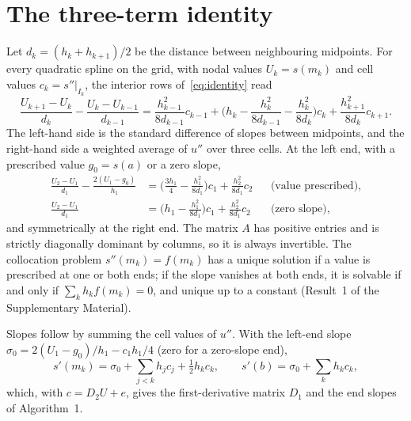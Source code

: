 \appendix

\section{The three-term identity}\label{app:identity}
Let $d_k=(h_k+h_{k+1})/2$ be the distance between neighbouring midpoints. For every quadratic spline on the
grid, with nodal values $U_k=s(m_k)$ and cell values $c_k=s''|_{I_k}$, the interior rows of~\eqref{eq:identity}
read
\begin{equation}\label{eq:interior}
\frac{U_{k+1}-U_k}{d_k}-\frac{U_k-U_{k-1}}{d_{k-1}}
=\frac{h_{k-1}^2}{8d_{k-1}}c_{k-1}+\Big(h_k-\frac{h_k^2}{8d_{k-1}}-\frac{h_k^2}{8d_k}\Big)c_k+\frac{h_{k+1}^2}{8d_k}c_{k+1}.
\end{equation}
The left-hand side is the standard difference of slopes between midpoints, and the right-hand side a
weighted average of $u''$ over three cells. At the left end, with a prescribed value $g_0=s(a)$ or a zero
slope,
\begin{align}
\frac{U_2-U_1}{d_1}-\frac{2(U_1-g_0)}{h_1}&=\Big(\frac{3h_1}{4}-\frac{h_1^2}{8d_1}\Big)c_1+\frac{h_2^2}{8d_1}c_2 &&\text{(value prescribed)},\label{eq:dirrow}\\
\frac{U_2-U_1}{d_1}&=\Big(h_1-\frac{h_1^2}{8d_1}\Big)c_1+\frac{h_2^2}{8d_1}c_2 &&\text{(zero slope)},\label{eq:neurow}
\end{align}
and symmetrically at the right end. The matrix $A$ has positive entries and is strictly diagonally dominant
by columns, so it is always invertible. The collocation problem $s''(m_k)=f(m_k)$ has a unique solution if a
value is prescribed at one or both ends; if the slope vanishes at both ends, it is solvable if and only if
$\sum_kh_kf(m_k)=0$, and unique up to a constant (Result~1 of the Supplementary Material).

Slopes follow by summing the cell values of $u''$. With the left-end slope
$\sigma_0=2(U_1-g_0)/h_1-c_1h_1/4$ (zero for a zero-slope end),
\begin{equation}\label{eq:D1}
s'(m_k)=\sigma_0+\sum_{j<k}h_jc_j+\tfrac12h_kc_k,\qquad s'(b)=\sigma_0+\sum_kh_kc_k,
\end{equation}
which, with $c=D_2U+e$, gives the first-derivative matrix $D_1$ and the end slopes of Algorithm~1.

